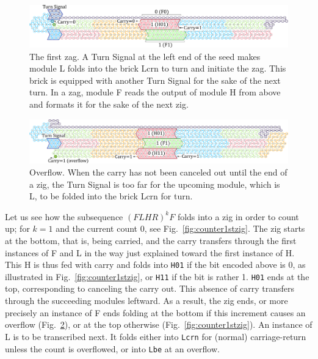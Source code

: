 \documentclass[twocolumn]{svjour3}
\begin{document}
\begin{figure}[tb]
\centering
\includegraphics[width=\linewidth]{fig/svg/CounterEx11_1.pdf}
\caption{
The first zag. 
A Turn Signal at the left end of the seed makes module L folds into the brick Lcrn to turn and initiate the zag. 
This brick is equipped with another Turn Signal for the sake of the next turn. 
In a zag, module F reads the output of module H from above and formats it for the sake of the next zig. 
}
\label{fig:counter1stzag}
\end{figure}

\begin{figure}[tb]
\centering
\includegraphics[width=\linewidth]{fig/svg/CounterEx13_1.pdf}
\caption{
Overflow. 
When the carry has not been canceled out until the end of a zig, the Turn Signal is too far for the upcoming module, which is L, to be folded into the brick Lcrn for turn. 
}
\label{fig:overflowex1}
\end{figure}

Let us see how the subsequence $(FLHR)^kF$ folds into a zig in order to count up; for $k=1$ and the current count 0, see Fig.~\ref{fig:counter1stzig}.
The zig starts at the bottom, that is, being carried, and the carry transfers through the first instances of F and L in the way just explained toward the first instance of H.
This H is thus fed with carry and folds into \texttt{H01} if the bit encoded above is 0, as illustrated in Fig.~\ref{fig:counter1stzig}, or \texttt{H11} if the bit is rather 1.
\texttt{H01} ends at the top, corresponding to canceling the carry out.
This absence of carry transfers through the succeeding modules leftward.
As a result, the zig ends, or more precisely an instance of F ends folding at the bottom if this increment causes an overflow (Fig.~\ref{fig:overflowex1}), or at the top otherwise (Fig.~\ref{fig:counter1stzig}).
An instance of L is to be transcribed next.
It folds either into \texttt{Lcrn} for (normal) carriage-return unless the count is overflowed, or into \texttt{Lbe} at an overflow.
\end{document}
